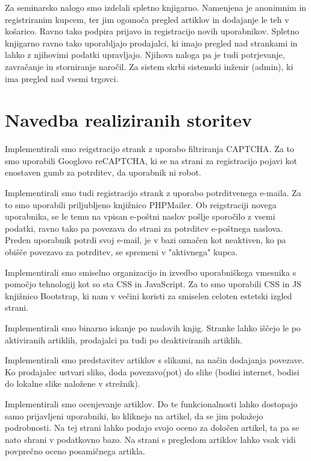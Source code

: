 \documentclass[a4paper,12pt]{report}
\begin{document}
Za seminarsko nalogo smo izdelali spletno knjigarno. Namenjena je anonimnim in registriranim kupcem, ter jim ogomoča pregled artiklov in dodajanje le teh v košarico. Ravno tako podpira prijavo in registracijo novih uporabnikov. Spletno knjigarno ravno tako uporabljajo prodajalci, ki imajo pregled nad strankami in lahko z njihovimi podatki upravljajo. Njihova naloga pa je tudi potrjevanje, zavračanje in storniranje naročil. Za sistem skrbi sistemski inženir (admin), ki ima pregled nad vsemi trgovci. 

\chapter{Navedba realiziranih storitev}

Implementirali smo reigstracijo strank z uporabo filtriranja CAPTCHA. Za to smo uporabili Googlovo reCAPTCHA, ki se na strani za registracijo pojavi kot enostaven gumb za potrditev, da uporabnik ni robot. \newline 

Implementirali smo tudi registracijo strank z uporabo potrditvenega e-maila. Za to smo uporabili priljubljeno knjižnico PHPMailer. Ob reigstraciji novega uporabnika, se le temu na vpisan e-poštni naslov pošlje sporočilo z vsemi podatki, ravno tako pa povezava do strani za potrditev e-poštnega naslova. Preden uporabnik potrdi svoj e-mail, je v bazi označen kot neaktiven, ko pa obišče povezavo za potrditev, se spremeni v "aktivnega" kupca. \newline

Implementirali smo smiselno organizacijo in izvedbo uporabniškega vmesnika s pomočjo tehnologij kot so sta CSS in JavaScript. Za to smo uporabili CSS in JS knjižnico Bootstrap, ki nam v večini koristi za smiselen celoten estetski izgled strani. \newline

Implementirali smo binarno iskanje po naslovih knjig. Stranke lahko iščejo le po aktiviranih artiklih, prodajalci pa tudi po deaktiviranih artiklih. \newline

Implementirali smo predstavitev artiklov s slikami, na način dodajanja povezave. Ko prodajalec ustvari sliko, doda povezavo(pot) do slike (bodisi internet, bodisi do lokalne slike naložene v strežnik).  \newline

Implementirali smo ocenjevanje artiklov. Do te funkcionalnosti lahko dostopajo samo prijavljeni uporabniki, ko kliknejo na artikel, da se jim pokažejo podrobnosti. Na tej strani lahko podajo svojo oceno za določen artikel, ta pa se nato shrani v podatkovno bazo. Na strani s pregledom artiklov lahko vsak vidi povprečno oceno posamičnega artikla. \newline
\end{document}
